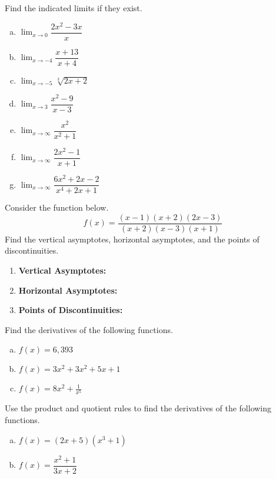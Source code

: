 \documentclass[11pt]{exam}
\theoremstyle{definition}
\newcommand{\ds}{\displaystyle}
\begin{document}
\begin{questions}
\addpoints
\question[7]Find the indicated limits if they exist. 
\begin{enumerate}[a)]

\item $\ds \lim_{x\rightarrow 0}\dfrac{2x^2-3x}{x}$
\vfill
\item $\ds \lim_{x\rightarrow -4}\dfrac{x+13}{x+4}$
\vfill
\item $\ds \lim_{x\rightarrow -5}\sqrt[3]{2x+2}$
\vfill
\item $\ds\lim_{x\rightarrow 3} \dfrac{x^2-9}{x-3}$
\vfill
\item $\ds\lim_{x\rightarrow \infty} \dfrac{x^2}{x^2+1}$
\vfill
\item $\ds\lim_{x\rightarrow \infty} \dfrac{2x^2-1}{x+1}$
\vfill
\item $\ds\lim_{x\rightarrow \infty} \dfrac{6x^2+2x-2}{x^4+2x+1}$
\end{enumerate}
\newpage
\addpoints
\question[4] Consider the function below. 
\[f(x)=\frac{(x-1)(x+2)(2x-3)}{(x+2)(x-3)(x+1)}\]
Find the vertical asymptotes, horizontal asymptotes, and the points of discontinuities. \\
\vspace{.25in}
\begin{enumerate}[\ ]
\item {\bf Vertical Asymptotes: }
\vspace{.5in}
\item {\bf Horizontal Asymptotes:}
\vspace{.5in}
\item {\bf Points of Discontinuities:}
\vfill
\end{enumerate}
\addpoints
\question[3] Find the derivatives of the following functions.
\begin{enumerate}[a)]
\item $f(x)=6,393$
\vfill
\item $f(x)=3x^2+3x^2+5x+1$
\vfill
\item $f(x)=8x^2+\frac{1}{x^5}$
\vfill
\end{enumerate}
\addpoints
\question[3] Use the product and quotient rules to find the derivatives of the following functions.
\begin{enumerate}[a)]
\item $f(x)=(2x+5)(x^3+1)$
\vfill
\item $f(x)=\dfrac{x^2+1}{3x+2}$
\vspace{.15in}
\end{enumerate}


\end{questions}
\end{document}
